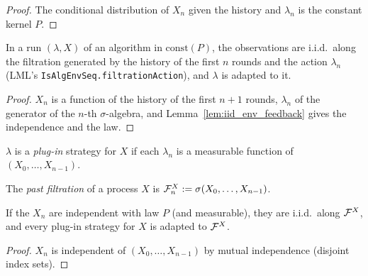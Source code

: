 \begin{proof}
  \leanok
  The conditional distribution of $X_n$ given the history and $\lambda_n$ is the constant kernel
  $P$.
\end{proof}

\begin{lemma}
  \label{lem:iid_of_run}
  \leanok
  In a run $(\lambda, X)$ of an algorithm in $\mathrm{const}(P)$, the observations are i.i.d.\ along
  the filtration generated by the history of the first $n$ rounds and the action $\lambda_n$
  (LML's \texttt{IsAlgEnvSeq.filtrationAction}), and $\lambda$ is adapted to it.
\end{lemma}

\begin{proof}
  \leanok
  $X_n$ is a function of the history of the first $n + 1$ rounds, $\lambda_n$ of the generator of
  the $n$-th $\sigma$-algebra, and Lemma~\ref{lem:iid_env_feedback} gives the independence and the
  law.
\end{proof}

\begin{definition}
  \label{def:plug_in}
  \leanok
  $\lambda$ is a \emph{plug-in} strategy for $X$ if each $\lambda_n$ is a measurable function of
  $(X_0, \dots, X_{n-1})$.
\end{definition}

\begin{definition}
  \label{def:past_filtration}
  \leanok
  The \emph{past filtration} of a process $X$ is $\mathcal{F}^X_n := \sigma(X_0, \dots, X_{n-1})$.
\end{definition}

\begin{lemma}
  \label{lem:iid_of_plug_in}
  \leanok
  If the $X_n$ are independent with law $P$ (and measurable), they are i.i.d.\ along $\mathcal{F}^X$, and
  every plug-in strategy for $X$ is adapted to $\mathcal{F}^X$.
\end{lemma}

\begin{proof}
  \leanok
  $X_n$ is independent of $(X_0, \dots, X_{n-1})$ by mutual independence (disjoint index sets).
\end{proof}

